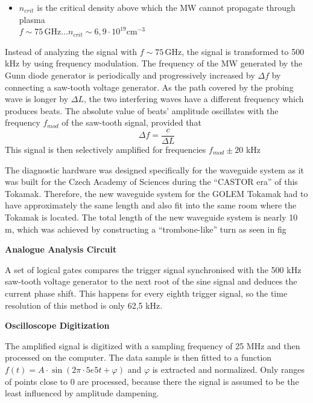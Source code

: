 \documentclass[portrait,final,a0paper]{baposter}
\begin{document}
\begin{poster}
{\begin{multicols}{2}
\begin{itemize}
\item $n_{crit}$ is the critical density above which the MW cannot propagate through plasma\\ $f \sim 75 \,\text{GHz} \ldots n_{crit} \sim 6,9 \cdot 10^{19} \text{cm}^{-3}$
\end{itemize}
\end{multicols}
 }
 {
 Instead of analyzing the signal with $f \sim 75 \,\text{GHz}$, the signal is transformed to 500 kHz by using frequency modulation. The frequency of the MW generated by the Gunn diode generator is periodically and progressively increased by $\Delta f$ by connecting a saw-tooth voltage generator. As the path covered by the probing wave is longer by $\Delta L$, the two interfering waves have a different frequency which produces beats. The absolute value of beats' amplitude oscillates with the frequency $f_{mod}$ of the saw-tooth signal, provided that\begin{equation}
     \Delta f = \frac{c}{\Delta L} 
     \label{eq:mod}
 \end{equation}
 This signal is then selectively amplified for frequencies $ f_{mod} \pm 20$ kHz
 }



{
 The diagnostic hardware was designed specifically for the waveguide system as it was built for the Czech Academy of Sciences during the ``CASTOR era'' of this Tokamak. Therefore, the new waveguide system for the GOLEM Tokamak had to have approximately the same length and also fit into the same room where the Tokamak is located.
The total length of the new waveguide system is nearly 10 m, which was achieved by constructing a ``trombone-like'' turn as seen in fig %
}

 {
\textbf{Analogue Analysis Circuit}
 
 A set of logical gates compares the trigger signal synchronised with the 500 kHz saw-tooth voltage generator to the next root of the sine signal and deduces the current phase shift. This happens for every eighth trigger signal, so the time resolution of this method is only 62,5 kHz.

 \textbf{Oscilloscope Digitization}

The amplified signal is digitized with a sampling frequency of 25 MHz and then processed on the computer. The data sample is then fitted to a function $f(t)=A \cdot \sin (2\pi\cdot 5e5 t + \varphi)$ and $\varphi$ is extracted and normalized. Only ranges of points close to $0$ are processed, because there the signal is assumed to be the least influenced by amplitude dampening.
 }


\end{poster}
\end{document}
